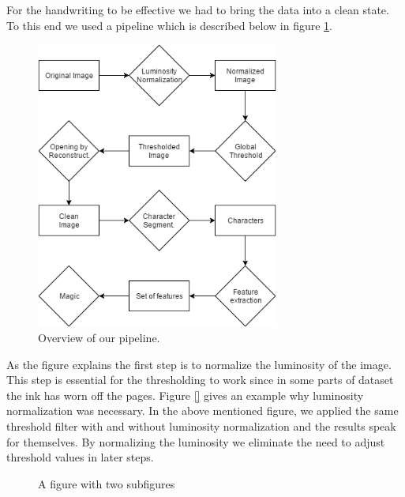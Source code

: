For the handwriting to be effective we had to bring the data into a clean state. To this end we used a pipeline which is described below in figure \ref{fig:pipeline}. 

\begin{figure}[ht]
\includegraphics[width=8cm]{shared/img/pipeline.png}
\caption{Overview of our pipeline.}
\label{fig:pipeline}
\end{figure}

As the figure explains the first step is to normalize the luminosity of the image. This step is essential for the thresholding to work since in some parts of dataset the ink has worn off the pages. Figure \ref{} gives an example why luminosity normalization was necessary. In the above mentioned figure, we applied the same threshold filter with and without luminosity normalization and the results speak for themselves. By normalizing the luminosity we eliminate the need to adjust threshold values in later steps.

\begin{figure}
\centering
{}
\hfil
{}
\caption{A figure with two subfigures}
\label{fig:test}
\end{figure}

